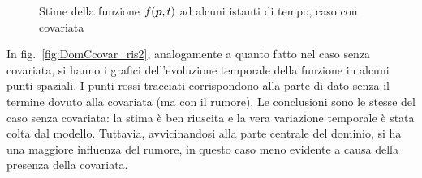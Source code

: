 \documentclass[a4paper,11pt,twoside,openright]{book}							%
\begin{document}
\begin{figure}[H]
{   }
\caption{Stime della funzione $f(\protect\bm{p},t)$ ad alcuni istanti di tempo, caso con covariata}
\label{fig:DomCcovar_ris}
\end{figure}
\newpage
In fig.~\ref{fig:DomCcovar_ris2}, analogamente a quanto fatto nel caso senza covariata, si hanno i grafici dell'evoluzione temporale della funzione in alcuni punti spaziali. I punti rossi tracciati corrispondono alla parte di dato senza il termine dovuto alla covariata (ma con il rumore). Le conclusioni sono le stesse del caso senza covariata: la stima è ben riuscita e la vera variazione temporale è stata colta dal modello. Tuttavia, avvicinandosi alla parte centrale del dominio, si ha una maggiore influenza del rumore, in questo caso meno evidente a causa della presenza della covariata.
\end{document}
